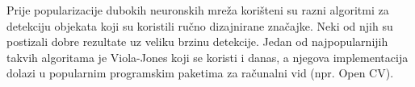 Prije popularizacije dubokih neuronskih mreža korišteni su razni algoritmi za detekciju objekata koji su koristili ručno dizajnirane značajke. Neki od njih su postizali dobre rezultate uz veliku brzinu detekcije. Jedan od najpopularnijih takvih algoritama je Viola-Jones koji se koristi i danas, a njegova implementacija dolazi u popularnim programskim paketima za računalni vid (npr. Open CV).